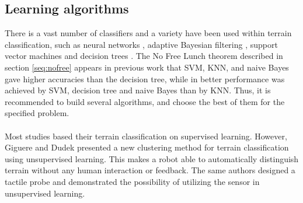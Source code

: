 \documentclass[USenglish]{ifimaster}  %
\begin{document}
\subsection{Learning algorithms}
There is a vast number of classifiers and a variety have been used within terrain classification, such as neural networks \cite{6784609,5752869,4654717}, adaptive Bayesian filtering  \cite{5152327,6849778}, support vector machines \cite{5602459,4161556,4059113} and decision trees  \cite{6849778}. The No Free Lunch theorem described in section \ref{seq:nofree} appears in previous work \cite{DBLP:conf/emcr/WeissFSZ07} that SVM, KNN, and naive Bayes gave higher accuracies than the decision tree, while in \cite{6849778} better performance was achieved by SVM, decision tree and naive Bayes than by KNN. Thus, it is recommended to build several algorithms, and choose the best of them for the specified problem. 
\\
\\
Most studies based their terrain classification on supervised learning. However, Giguere and Dudek \cite{Giguere2009} presented a new clustering method for terrain classification using unsupervised learning. This makes a robot able to automatically distinguish terrain without any human interaction or feedback. The same authors \cite{5752869} designed a tactile probe and demonstrated the possibility of utilizing the sensor in unsupervised learning. 
	
\end{document}
